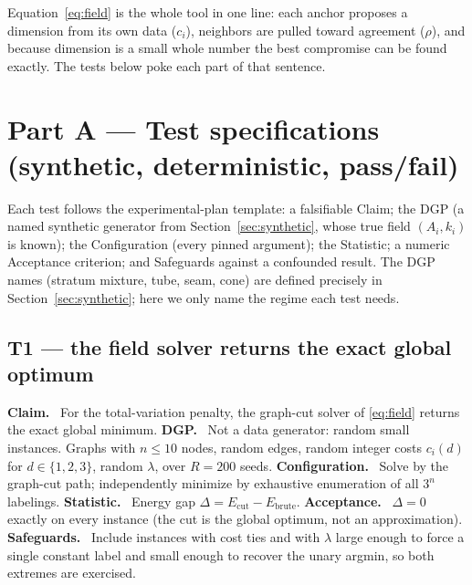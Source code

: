 \documentclass[11pt]{article}
\theoremstyle{definition}
\newcommand{\field}[1]{\smallskip\noindent\textbf{\textsf{#1.}}\ }
\begin{document}
\begin{plain}
Equation~\eqref{eq:field} is the whole tool in one line: each anchor proposes a
dimension from its own data ($c_i$), neighbors are pulled toward agreement
($\rho$), and because dimension is a small whole number the best compromise can be
found exactly. The tests below poke each part of that sentence.
\end{plain}

\section{Part A --- Test specifications (synthetic, deterministic, pass/fail)}
\label{sec:tests}

Each test follows the experimental-plan template: a falsifiable \textsf{Claim};
the \textsf{DGP} (a named synthetic generator from Section~\ref{sec:synthetic},
whose true field $(A_i,k_i)$ is known); the \textsf{Configuration} (every pinned
argument); the \textsf{Statistic}; a numeric \textsf{Acceptance} criterion; and
\textsf{Safeguards} against a confounded result. The DGP names (stratum mixture,
tube, seam, cone) are defined precisely in Section~\ref{sec:synthetic}; here we
only name the regime each test needs.

\subsection{T1 --- the field solver returns the exact global optimum}
\field{Claim} For the total-variation penalty, the graph-cut solver of
\eqref{eq:field} returns the exact global minimum.
\field{DGP} Not a data generator: random small instances. Graphs with $n\le 10$
nodes, random edges, random integer costs $c_i(d)$ for $d\in\{1,2,3\}$, random
$\lambda$, over $R=200$ seeds.
\field{Configuration} Solve by the graph-cut path; independently minimize by
exhaustive enumeration of all $3^{n}$ labelings.
\field{Statistic} Energy gap $\Delta = E_{\text{cut}} - E_{\text{brute}}$.
\field{Acceptance} $\Delta = 0$ exactly on every instance (the cut is the global
optimum, not an approximation).
\field{Safeguards} Include instances with cost ties and with $\lambda$ large
enough to force a single constant label and small enough to recover the unary
argmin, so both extremes are exercised.
\end{document}
